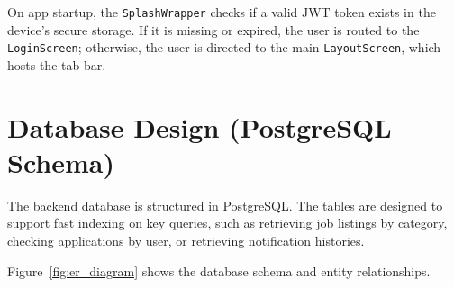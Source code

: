 On app startup, the \texttt{SplashWrapper} checks if a valid JWT token exists in the device's secure storage. If it is missing or expired, the user is routed to the \texttt{LoginScreen}; otherwise, the user is directed to the main \texttt{LayoutScreen}, which hosts the tab bar.

\section{Database Design (PostgreSQL Schema)}
The backend database is structured in PostgreSQL. The tables are designed to support fast indexing on key queries, such as retrieving job listings by category, checking applications by user, or retrieving notification histories.

Figure~\ref{fig:er_diagram} shows the database schema and entity relationships.

